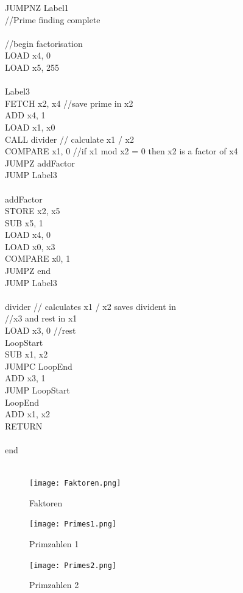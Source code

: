 \documentclass{scrartcl}
\begin{document}
\begin{multicols*}{2}
JUMPNZ Label1 \\
//Prime finding complete\\
\\
//begin factorisation\\
LOAD x4, 0\\
LOAD x5, 255\\
\\
Label3\\
FETCH x2, x4 //save prime in x2\\
ADD x4, 1\\
LOAD x1, x0\\
CALL divider // calculate x1 / x2\\
COMPARE x1, 0 //if x1 mod x2 = 0 then x2 is a factor of x4\\
JUMPZ addFactor\\
JUMP Label3\\
\\
addFactor\\
STORE x2, x5\\
SUB x5, 1\\
LOAD x4, 0\\
LOAD x0, x3\\
COMPARE x0, 1\\
JUMPZ end\\
JUMP Label3\\
\\
divider // calculates x1 / x2 saves divident in\\
//x3 and rest in x1\\
LOAD x3, 0 //rest\\
LoopStart\\
SUB x1, x2\\
JUMPC LoopEnd\\
ADD x3, 1\\
JUMP LoopStart\\
LoopEnd\\
ADD x1, x2\\
RETURN\\
\\
end\\
\\
\end{multicols*}
\begin{figure}[H]
    \centering
    \texttt{[image: Faktoren.png]}
    \caption{Faktoren}
    \label{fig:Faktoren}
\end{figure}
\begin{figure}[H]
    \centering
    \texttt{[image: Primes1.png]}
    \caption{Primzahlen 1}
    \label{fig:Primes1}
\end{figure}
\begin{figure}[H]
    \centering
    \texttt{[image: Primes2.png]}
    \caption{Primzahlen 2}
    \label{fig:Primes2}
\end{figure}
\newpage
\end{document}
